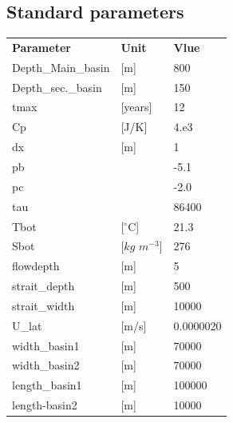 \documentclass[twocolumn]{article}
\begin{document}
\clearpage
\pagebreak
\begin{appendices}
\section{Standard parameters}
\label{app:standard_parameters}
\begin{table}[H]
\begin{tabular}{lll}
\textbf{Parameter}          &\textbf{Unit}                  & \textbf{Vlue} \\   
Depth\_Main\_basin          &{[}m{]}                        & 800       \\
Depth\_sec.\_basin          &{[}m{]}                        & 150       \\
tmax                        &{[}years{]}                    & 12        \\
Cp                          &{[}J/K{]}                      & 4.e3      \\
dx                          &{[}m{]}                        & 1         \\
pb                          &                               & -5.1      \\
pc                          &                               & -2.0      \\
tau                         &                               & 86400     \\
Tbot                        &{[}$^{\circ}$C{]}              & 21.3      \\
Sbot                        &{[}$kg$ $m^{-3}${]}            & 276       \\
flowdepth                   &{[}m{]}                        & 5         \\
strait\_depth               &{[}m{]}                        & 500       \\
strait\_width               &{[}m{]}                        & 10000     \\
U\_lat                      &{[}m/s{]}                      & 0.0000020 \\
width\_basin1               &{[}m{]}                        & 70000     \\
width\_basin2               &{[}m{]}                        & 70000     \\
length\_basin1              &{[}m{]}                        & 100000    \\
length-basin2               &{[}m{]}                        & 10000     \\

\end{tabular}
\end{table}
\end{appendices}
\end{document}
